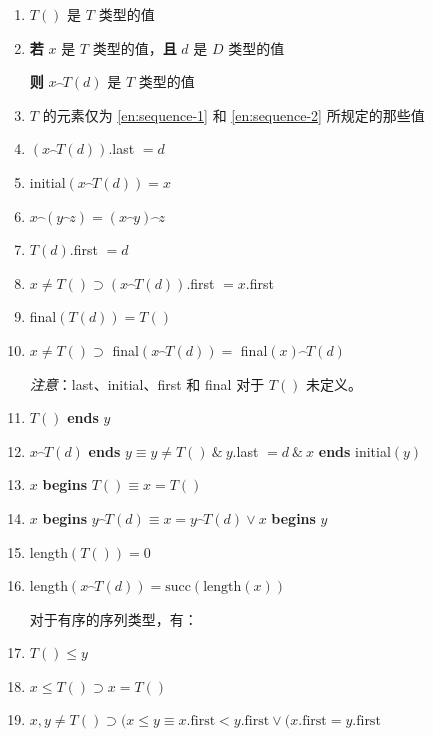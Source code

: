 \documentclass[twoside,11pt,fontset=none]{ctexbook}
\let\wideparen\overparen
\begin{document}
\begin{enumerate}[wide, nosep, label=(\arabic*)]
	\item \label{en:sequence-1}
	$T()$ 是 $T$ 类型的值
	
	\item \label{en:sequence-2}
	\textbf{若} $x$ 是 $T$ 类型的值，\textbf{且} $d$ 是 $D$ 类型的值
	
	\qquad\quad \textbf{则} $x\wideparen{\ \ }T(d)$ 是 $T$ 类型的值

	\item $T$ 的元素仅为 \ref{en:sequence-1} 和 \ref{en:sequence-2} 所规定的那些值

	\item $(x\wideparen{\ \ }T(d))$.last $= d$

	\item initial$(x\wideparen{\ \ }T(d)) = x$
	\item $x\wideparen{\ \ }(y\wideparen{\ \ }z) = (x\wideparen{\ \ }y)\wideparen{\ \ }z$
	\item $T(d)$.first $= d$
	\item $x \neq T() \supset (x\wideparen{\ \ }T(d))$.first $= x$.first
	\item final$(T(d)) = T()$
	\item $x \neq T() \supset$ final$(x\wideparen{\ \ }T(d)) =$ final$(x)\wideparen{\ \ }T(d)$

	\noindent
	\textit{注意}：last、initial、first 和 final 对于 $T()$ 未定义。

	\item $T()$ \textbf{ends} $y$
	\item $x\wideparen{\ \ }T(d)$ \textbf{ends} $y \equiv y \neq T()\ \&\ y$.last $= d\ \&\ x$ \textbf{ends} initial$(y)$
	\item $x$ \textbf{begins} $T() \equiv x = T()$
	\item $x$ \textbf{begins} $y\wideparen{\ \ }T(d) \equiv x = y\wideparen{\ \ }T(d) \lor x$ \textbf{begins} $y$
	\item length$(T()) = 0$
	\item length$(x\wideparen{\ \ }T(d)) = \text{succ}(\text{length}(x))$

	\noindent
	对于有序的序列类型，有：

	\item $T() \leqslant y$
	\item $x \leqslant T() \supset x = T()$
	\item $x, y \neq T() \supset (x \leqslant y \equiv x.\text{first} < y.\text{first} \lor (x.\text{first} = y.\text{first}$
	

\end{enumerate}
\end{document}
